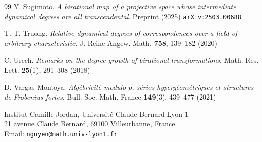 \documentclass[11pt,a4paper]{article}
\theoremstyle{plain}
\theoremstyle{remark}
\theoremstyle{custombold}
\begin{document}
\begin{thebibliography}{99}
 Y. Sugimoto. \textit{A birational map of a projective space whose intermediate dynamical degrees are all transcendental}. Preprint (2025) \texttt{arXiv:2503.00688}

 T.-T. Truong. \textit{Relative dynamical degrees of correspondences over a field of arbitrary characteristic}. J. Reine Angew. Math. \textbf{758}, 139--182 (2020)

 C. Urech. \textit{Remarks on the degree growth of birational transformations}. Math. Res. Lett. \textbf{25}(1), 291--308 (2018)

 D. Vargas-Montoya. \textit{Alg\'ebricit\'e modulo $p$, s\'eries hyperg\'eom\'etriques et structures de Frobenius fortes}. Bull. Soc. Math. France \textbf{149}(3), 439--477 (2021)
\end{thebibliography}
{Institut Camille Jordan, Universit\'e Claude Bernard Lyon 1\\ 21 avenue Claude Bernard, 69100 Villeurbanne, France}\\Email: \texttt{nguyen@math.univ-lyon1.fr} 
\end{document}
